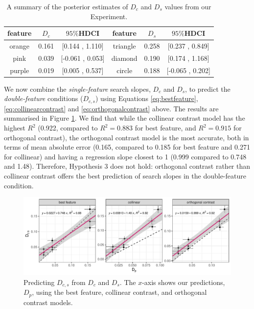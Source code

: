 \documentclass[preprint,12pt,authoryear]{elsarticle}
\begin{document}
\begin{table}[h]
\centering
\begin{tabular}{|c|cc||c|cc|} 
\hline
feature & $D_c$ & $95\%$HDCI &feature &$D_s$  &$95\%$HDCI \\
 \hline 
orange & 0.161 &  [0.144 ,  1.110] & triangle  &  0.258  & [0.237  , 0.849]\\
pink  &  0.039 &  [-0.061 , 0.053] & diamond& 0.190 &  [0.174 ,  1.168]\\
purple & 0.019 &  [0.005  , 0.537] & circle & 0.188  & [-0.065 , 0.202]\\
 \hline 
 \end{tabular}
\caption{A summary of the posterior estimates of $D_c$ and $D_s$ values from our Experiment.}
\label{tab:new_Dc_Ds}
\end{table}

We now combine the \textit{single-feature} search slopes, $D_c$ and $D_s$, to predict the \textit{double-feature} conditions ($D_{c,s}$) using Equations \ref{eq:bestfeature}, \ref{eq:collinearcontrast} and \ref{eq:orthogonalcontrast} above. The results are summarised in Figure \ref{fig:new:Dpe}. We find that while the collinear contrast model has the highest $R^2$ (0.922, compared to $R^2=0.883$ for best feature, and $R^2=0.915$ for orthogonal contrast), the orthogonal contrast model is the most accurate, both in terms of mean absolute error (0.165, compared to 0.185 for best feature and 0.271 for collinear) and having a regression slope closest to 1 (0.999 compared to 0.748 and 1.48). Therefore, Hypothesis 3 does not hold: orthogonal contrast rather than collinear contrast offers the best prediction of search slopes in the double-feature condition.  

\begin{figure}[ht]
\centering
\includegraphics[width=\textwidth]{../plots/Dpe.pdf}
\caption{Predicting $D_{c,s}$ from $D_c$ and $D_s$. The $x$-axis shows our predictions, $D_p$, using the best feature, collinear contrast, and orthogonal contrast models.}
\label{fig:new:Dpe}
\end{figure}
\end{document}
